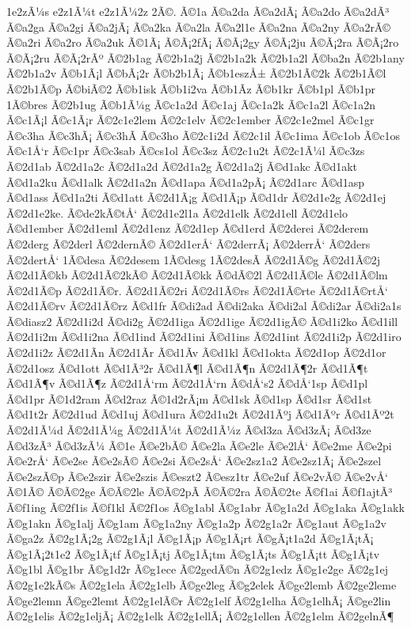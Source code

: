 {1e2zÃ¼s
e2z1Ã¼t
e2z1Ã¼2z
2Ã©.
Ã©1a
Ã©a2da
Ã©a2dÃ¡
Ã©a2do
Ã©a2dÃ³
Ã©a2ga
Ã©a2gi
Ã©a2jÃ¡
Ã©a2ka
Ã©a2la
Ã©a2l1e
Ã©a2na
Ã©a2ny
Ã©a2rÃ©
Ã©a2ri
Ã©a2ro
Ã©a2uk
Ã©1Ã¡
Ã©Ã¡2fÃ¡
Ã©Ã¡2gy
Ã©Ã¡2ju
Ã©Ã¡2ra
Ã©Ã¡2ro
Ã©Ã¡2ru
Ã©Ã¡2rÃº
Ã©2b1ag
Ã©2b1a2j
Ã©2b1a2k
Ã©2b1a2l
Ã©ba2n
Ã©2b1any
Ã©2b1a2v
Ã©b1Ã¡l
Ã©bÃ¡2r
Ã©b2b1Ã¡
Ã©b1eszÅ±
Ã©2b1Ã©2k
Ã©2b1Ã©l
Ã©2b1Ã©p
Ã©biÃ©2
Ã©b1isk
Ã©b1i2va
Ã©b1Ã­z
Ã©b1kr
Ã©b1pl
Ã©b1pr
1Ã©bres
Ã©2b1ug
Ã©b1Ã¼g
Ã©c1a2d
Ã©c1aj
Ã©c1a2k
Ã©c1a2l
Ã©c1a2n
Ã©c1Ã¡l
Ã©c1Ã¡r
Ã©2c1e2lem
Ã©2c1elv
Ã©2c1ember
Ã©2c1e2mel
Ã©c1gr
Ã©c3ha
Ã©c3hÃ¡
Ã©c3hÃ­
Ã©c3ho
Ã©2c1i2d
Ã©2c1il
Ã©c1ima
Ã©c1ob
Ã©c1os
Ã©c1Å‘r
Ã©c1pr
Ã©c3sab
Ã©cs1ol
Ã©c3sz
Ã©2c1u2t
Ã©2c1Ã¼l
Ã©c3zs
Ã©2d1ab
Ã©2d1a2c
Ã©2d1a2d
Ã©2d1a2g
Ã©2d1a2j
Ã©d1akc
Ã©d1akt
Ã©d1a2ku
Ã©d1alk
Ã©2d1a2n
Ã©d1apa
Ã©d1a2pÃ¡
Ã©2d1arc
Ã©d1asp
Ã©d1ass
Ã©d1a2ti
Ã©d1att
Ã©2d1Ã¡g
Ã©d1Ã¡p
Ã©d1dr
Ã©2d1e2g
Ã©2d1ej
Ã©2d1e2ke.
Ã©de2kÃ©tÅ‘
Ã©2d1e2l1a
Ã©2d1elk
Ã©2d1ell
Ã©2d1elo
Ã©d1ember
Ã©2d1eml
Ã©2d1enz
Ã©2d1ep
Ã©d1erd
Ã©2derei
Ã©2derem
Ã©2derg
Ã©2derl
Ã©2dernÃ©
Ã©2d1erÅ‘
Ã©2derrÃ¡
Ã©2derrÅ‘
Ã©2ders
Ã©2dertÅ‘
1Ã©desa
Ã©2desem
1Ã©desg
1Ã©2desÃ­
Ã©2d1Ã©g
Ã©2d1Ã©2j
Ã©2d1Ã©kb
Ã©2d1Ã©2kÃ©
Ã©2d1Ã©kk
Ã©dÃ©2l
Ã©2d1Ã©le
Ã©2d1Ã©lm
Ã©2d1Ã©p
Ã©2d1Ã©r.
Ã©2d1Ã©2ri
Ã©2d1Ã©rs
Ã©2d1Ã©rte
Ã©2d1Ã©rtÅ‘
Ã©2d1Ã©rv
Ã©2d1Ã©rz
Ã©d1fr
Ã©di2ad
Ã©di2aka
Ã©di2al
Ã©di2ar
Ã©di2a1s
Ã©diasz2
Ã©2d1i2d
Ã©di2g
Ã©2d1iga
Ã©2d1ige
Ã©2d1igÃ©
Ã©d1i2ko
Ã©d1ill
Ã©2d1i2m
Ã©d1i2na
Ã©d1ind
Ã©2d1ini
Ã©d1ins
Ã©2d1int
Ã©2d1i2p
Ã©2d1iro
Ã©2d1i2z
Ã©2d1Ã­n
Ã©2d1Ã­r
Ã©d1Ã­v
Ã©d1kl
Ã©d1okta
Ã©2d1op
Ã©2d1or
Ã©2d1osz
Ã©d1ott
Ã©d1Ã³2r
Ã©d1Ã¶l
Ã©d1Ã¶n
Ã©2d1Ã¶2r
Ã©d1Ã¶t
Ã©d1Ã¶v
Ã©d1Ã¶z
Ã©2d1Å‘rm
Ã©2d1Å‘rn
Ã©dÅ‘s2
Ã©dÅ‘1sp
Ã©d1pl
Ã©d1pr
Ã©1d2ram
Ã©d2raz
Ã©1d2rÃ¡m
Ã©d1sk
Ã©d1sp
Ã©d1sr
Ã©d1st
Ã©d1t2r
Ã©2d1ud
Ã©d1uj
Ã©d1ura
Ã©2d1u2t
Ã©2d1Ãºj
Ã©d1Ãºr
Ã©d1Ãº2t
Ã©2d1Ã¼d
Ã©2d1Ã¼g
Ã©2d1Ã¼t
Ã©2d1Ã¼z
Ã©d3za
Ã©d3zÃ¡
Ã©d3ze
Ã©d3zÃ³
Ã©d3zÃ¼
Ã©1e
Ã©e2bÃ©
Ã©e2la
Ã©e2le
Ã©e2lÅ‘
Ã©e2me
Ã©e2pi
Ã©e2rÅ‘
Ã©e2se
Ã©e2sÃ©
Ã©e2si
Ã©e2sÅ‘
Ã©e2sz1a2
Ã©e2sz1Ã¡
Ã©e2szel
Ã©e2szÃ©p
Ã©e2szir
Ã©e2szis
Ã©eszt2
Ã©esz1tr
Ã©e2uf
Ã©e2vÃ©
Ã©e2vÅ‘
Ã©1Ã©
Ã©Ã©2ge
Ã©Ã©2le
Ã©Ã©2pÃ­
Ã©Ã©2ra
Ã©Ã©2te
Ã©f1ai
Ã©f1ajtÃ³
Ã©f1ing
Ã©2f1is
Ã©f1kl
Ã©2f1os
Ã©g1abl
Ã©g1abr
Ã©g1a2d
Ã©g1aka
Ã©g1akk
Ã©g1akn
Ã©g1alj
Ã©g1am
Ã©g1a2ny
Ã©g1a2p
Ã©2g1a2r
Ã©g1aut
Ã©g1a2v
Ã©ga2z
Ã©2g1Ã¡2g
Ã©2g1Ã¡l
Ã©g1Ã¡p
Ã©g1Ã¡rt
Ã©gÃ¡t1a2d
Ã©g1Ã¡tÃ¡
Ã©g1Ã¡2t1e2
Ã©g1Ã¡tf
Ã©g1Ã¡tj
Ã©g1Ã¡tm
Ã©g1Ã¡ts
Ã©g1Ã¡tt
Ã©g1Ã¡tv
Ã©g1bl
Ã©g1br
Ã©g1d2r
Ã©g1ece
Ã©2gedÃ©n
Ã©2g1edz
Ã©g1e2ge
Ã©2g1ej
Ã©2g1e2kÃ©s
Ã©2g1ela
Ã©2g1elb
Ã©ge2leg
Ã©g2elek
Ã©ge2lemb
Ã©2ge2leme
Ã©ge2lemn
Ã©ge2lemt
Ã©2g1elÃ©r
Ã©2g1elf
Ã©2g1elha
Ã©g1elhÃ¡
Ã©ge2lin
Ã©2g1elis
Ã©2g1eljÃ¡
Ã©2g1elk
Ã©2g1ellÃ¡
Ã©2g1ellen
Ã©2g1elm
Ã©2gelnÃ¶
}
